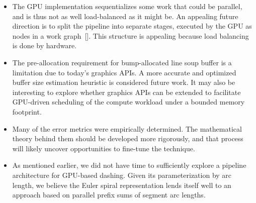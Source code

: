 \documentclass[sigconf, nonacm]{acmart}
\begin{document}
\begin{itemize}
    \item The GPU implementation sequentializes some work that could be parallel, and is thus not as well load-balanced as it might be. An appealing future direction is to split the pipeline into separate stages, executed by the GPU as nodes in a work graph~[]. This structure is appealing because load balancing is done by hardware.

    \item The pre-allocation requirement for bump-allocated line soup buffer is a limitation due to today's graphics APIs. A more accurate and optimized buffer size estimation heuristic is considered future work. It may also be interesting to explore whether graphics APIs can be extended to facilitate GPU-driven scheduling of the compute workload under a bounded memory footprint.

    \item Many of the error metrics were empirically determined. The mathematical theory behind them should be developed more rigorously, and that process will likely uncover opportunities to fine-tune the technique.

    \item As mentioned earlier, we did not have time to sufficiently explore a pipeline architecture for GPU-based dashing. Given its parameterization by arc length, we believe the Euler spiral representation lends itself well to an approach based on parallel prefix sums of segment arc lengths.
\end{itemize}




\end{document}
